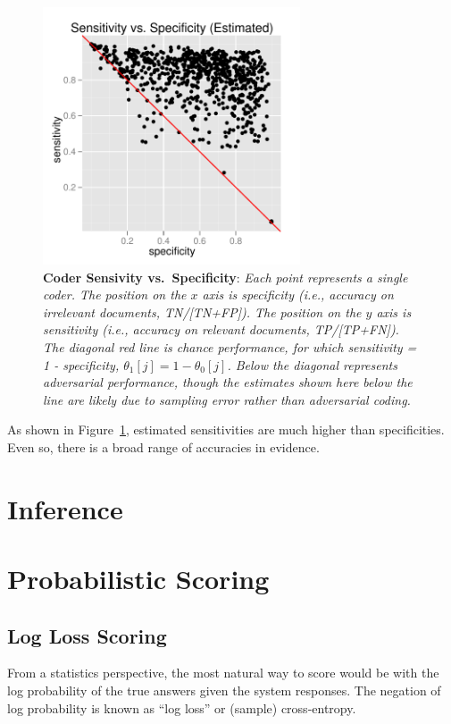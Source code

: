 \documentclass{article}
\begin{document}
\begin{figure}
\begin{center}
\includegraphics[height=3.0in]{img/sens_vs_spec_hat.pdf}
\end{center}
\caption{\small {\bf Coder Sensivity vs.\ Specificity}: {\it Each point
represents a single coder.  The position on the $x$ axis is
specificity (i.e., accuracy on irrelevant documents, TN/[TN+FP]).  The position
on the $y$ axis is sensitivity (i.e., accuracy on relevant documents, 
TP/[TP+FN]).  The diagonal red line is chance performance, for
which sensitivity = 1 - specificity, $\theta_1[j] =
1 - \theta_0[j]$. Below the diagonal represents adversarial
performance, though the estimates shown here below the line are
likely due to sampling error rather than adversarial coding.}}%
\label{sens_spec.fig}
\end{figure}

As shown in Figure~\ref{sens_spec.fig}, estimated sensitivities are
much higher than specificities.  Even so, there is a broad range of
accuracies in evidence.


\section{Inference}


\section{Probabilistic Scoring}

\subsection{Log Loss Scoring}

From a statistics perspective, the most natural way to score would be
with the log probability of the true answers given the system
responses.  The negation of log probability is known as ``log loss''
or (sample) cross-entropy.
\end{document}
